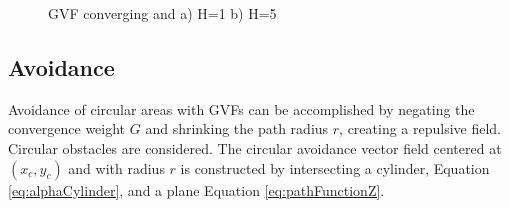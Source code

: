 \documentclass[conf]{new-aiaa}
\begin{document}
\begin{figure}[H]
	\begin{subfigmatrix}{2}%
		\centering	
		
		\hspace*{0mm}
	\end{subfigmatrix}
	\caption{GVF converging and a) H=1 b) H=5}
	\label{fig:GVFLine}
\end{figure} 



\subsection{Avoidance}
Avoidance of circular areas with GVFs can be accomplished by negating the convergence weight $G$ and shrinking the path radius $r$, creating a repulsive field. Circular obstacles are considered. The circular avoidance vector field centered at $(x_c,y_c)$ and with radius $r$ is constructed by intersecting a cylinder, Equation \ref{eq:alphaCylinder}, and a plane Equation \ref{eq:pathFunctionZ}. 
\end{document}
